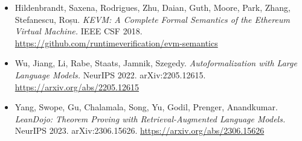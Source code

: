 \documentclass[
  11pt,
]{article}
\renewcommand{\_}{\origunderscore\allowbreak}
\begin{document}
\begin{itemize}
  \url{https://link.springer.com/chapter/10.1007/978-3-319-63046-5_3}
\item
  Hildenbrandt, Saxena, Rodrigues, Zhu, Daian, Guth, Moore, Park, Zhang,
  Stefanescu, Roșu. \emph{KEVM: A Complete Formal Semantics of the
  Ethereum Virtual Machine.} IEEE CSF 2018.
  \url{https://github.com/runtimeverification/evm-semantics}
\item
  Wu, Jiang, Li, Rabe, Staats, Jamnik, Szegedy. \emph{Autoformalization
  with Large Language Models.} NeurIPS 2022. arXiv:2205.12615.
  \url{https://arxiv.org/abs/2205.12615}
\item
  Yang, Swope, Gu, Chalamala, Song, Yu, Godil, Prenger, Anandkumar.
  \emph{LeanDojo: Theorem Proving with Retrieval-Augmented Language
  Models.} NeurIPS 2023. arXiv:2306.15626.
  \url{https://arxiv.org/abs/2306.15626}
\end{itemize}
\end{document}
